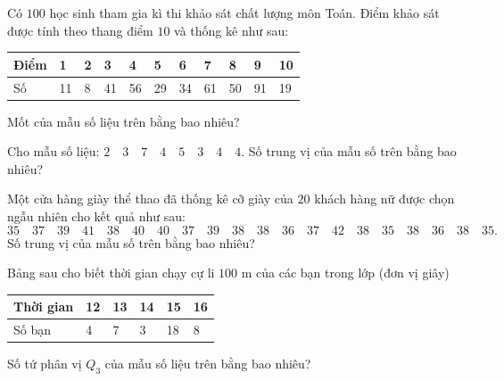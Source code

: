 \begin{ex}%
Có $100$ học sinh tham gia kì thi khảo sát chất lượng môn Toán. Điểm khảo sát được tính theo thang điểm $10$ và thống kê như sau:
\begin{center}
\begin{tabular}{|l|l|l|l|l|l|l|l|l|l|l|}
\hline Điểm & 1 & 2 & 3 & 4 & 5 & 6 & 7 & 8 & 9 & 10 \\
\hline Số & 11 & 8 & 41 & 56 & 29 & 34 & 61 & 50 & 91 & 19 \\
\hline
\end{tabular}
\end{center}
Mốt của mẫu số liệu trên bằng bao nhiêu?
\end{ex}

\begin{ex}%
Cho mẫu số liệu: $2\quad 3\quad 7\quad 4\quad 5\quad 3\quad 4\quad 4$. Số trung vị của mẫu số trên bằng bao nhiêu?
\end{ex}

\begin{ex}%
Một cửa hàng giày thể thao đã thống kê cỡ giày của $20$ khách hàng nữ được chọn ngẫu nhiên cho kết quả như sau:
$$
35\quad 37\quad 39\quad 41\quad 38\quad 40\quad 40\quad 37\quad 39\quad 38\quad 38\quad 36\quad 37\quad 42\quad 38\quad 35\quad 38\quad 36\quad 38\quad 35.
$$
Số trung vị của mẫu số trên bằng bao nhiêu?
\end{ex}

\begin{ex}%
Bảng sau cho biết thời gian chạy cự li $100$ m của các bạn trong lớp (đơn vị giây)
\begin{center}
\begin{tabular}{|l|l|l|l|l|l|}
\hline Thời gian & 12 & 13 & 14 & 15 & 16 \\
\hline Số bạn & 4 & 7 & 3 & 18 & 8 \\
\hline
\end{tabular}
\end{center}
Số tứ phân vị $Q_3$ của mẫu số liệu trên bằng bao nhiêu?
\end{ex}


